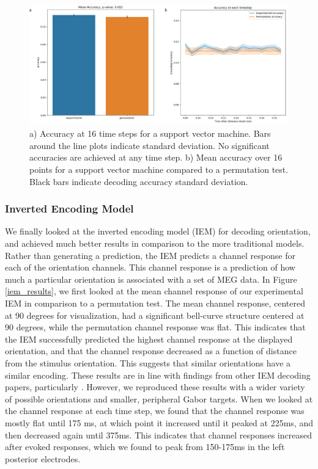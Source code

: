 \documentclass[../main.tex]{subfiles}
\begin{document}
\begin{figure}
    \centering
    \includegraphics[scale=0.7]{figures/results/svm_sensor_accuracy.png}
    \caption{a) Accuracy at 16 time steps for a support vector machine.  Bars around the line plots indicate standard deviation. No significant accuracies are achieved at any time step. b) Mean accuracy over 16 points for a support vector machine compared to a permutation test. Black bars indicate decoding accuracy standard deviation.}
    \label{svm_sensor_accuracy}
\end{figure}

\subsubsection{Inverted Encoding Model}
We finally looked at the inverted encoding model (IEM) for decoding orientation, and achieved much better results in comparison to the more traditional models. Rather than generating a prediction, the IEM predicts a channel response for each of the orientation channels. This channel response is a prediction of how much a particular orientation is associated with a set of MEG data. In Figure \ref{iem_results}, we first looked at the mean channel response of our experimental IEM in comparison to a permutation test. The mean channel response, centered at 90 degrees for visualization, had a significant bell-curve structure centered at 90 degrees, while the permutation channel response was flat. This indicates that the IEM successfully predicted the highest channel response at the displayed orientation, and that the channel response decreased as a function of distance from the stimulus orientation. This suggests that similar orientations have a similar encoding. These results are in line with findings from other IEM decoding papers, particularly \cite{GARCIA2013515}. However, we reproduced these results with a wider variety of possible orientations and smaller, peripheral Gabor targets. When we looked at the channel response at each time step, we found that the channel response was mostly flat until 175 ms, at which point it increased until it peaked at 225ms, and then decreased again until 375ms. This indicates that channel responses increased after evoked responses, which we found to peak from 150-175ms in the left posterior electrodes.
\end{document}
